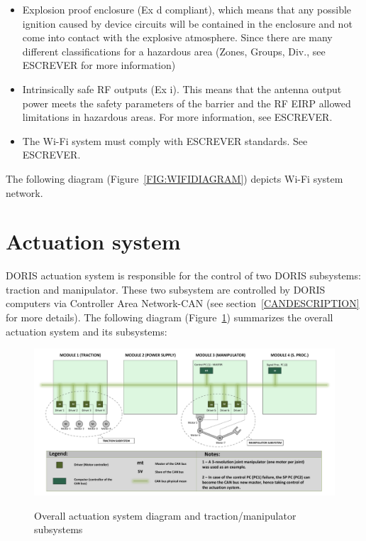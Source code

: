 \begin{itemize}
      \begin{itemize}
        \item Explosion proof enclosure (Ex d compliant), which means that any possible ignition caused by device circuits will be contained in the enclosure and not come into contact with the explosive atmosphere. Since there are many different classifications for a hazardous area (Zones, Groups, Div., see ESCREVER for more information)
        \item Intrinsically safe RF outputs (Ex i). This means that the antenna output power meets the safety parameters of the barrier and the RF EIRP allowed limitations in hazardous areas. For more information, see ESCREVER.
        \item The Wi-Fi system must comply with ESCREVER standards. See ESCREVER.
      \end{itemize}
\end{itemize}
The following diagram (Figure~\ref{FIG:WIFIDIAGRAM}) depicts Wi-Fi system network.
\section{Actuation system}
DORIS actuation system is responsible for the control of two DORIS subsystems: traction and manipulator. These two subsystem are controlled by DORIS computers via Controller Area Network-CAN (see section~\ref{CANDESCRIPTION} for more details). The following diagram (Figure~\ref{FIG:OVERALLACTDIAGRAM}) summarizes the overall actuation system and its subsystems:

\begin{figure}
  \centering
  \includegraphics[angle=90,width=1\columnwidth]{figs/body01/FIGOVERALLACTDIAGRAM.pdf}\\
  \caption[Overall actuation system diagram and traction/manipulator subsystems]{Overall actuation system diagram and traction/manipulator subsystems}
  \label{FIG:OVERALLACTDIAGRAM}
\end{figure}

